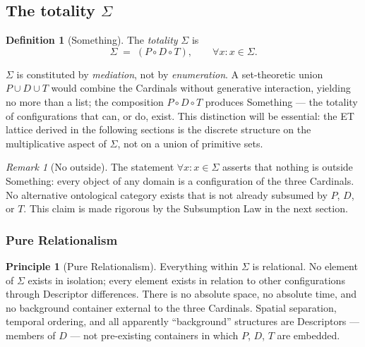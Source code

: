 \documentclass[11pt,a4paper]{article}
\theoremstyle{definition}
\newtheorem{definition}[theorem]{Definition}
\newtheorem{principle}[theorem]{Principle}
\theoremstyle{remark}
\newtheorem{remark}[theorem]{Remark}
\begin{document}
\subsection{The totality $\Sigma$}\label{subsec:Sigma}

\begin{definition}[Something]\label{def:Sigma}
The \emph{totality} $\Sigma$ is
\[
\Sigma \;=\; (P \circ D \circ T), \qquad \forall x: x \in \Sigma.
\]
\end{definition}

$\Sigma$ is constituted by \emph{mediation}, not by \emph{enumeration}. A set-theoretic union $P \cup D \cup T$ would combine the Cardinals without generative interaction, yielding no more than a list; the composition $P \circ D \circ T$ produces Something --- the totality of configurations that can, or do, exist. This distinction will be essential: the ET lattice derived in the following sections is the discrete structure on the multiplicative aspect of $\Sigma$, not on a union of primitive sets.

\begin{remark}[No outside]
The statement $\forall x : x \in \Sigma$ asserts that nothing is outside Something: every object of any domain is a configuration of the three Cardinals. No alternative ontological category exists that is not already subsumed by $P$, $D$, or $T$. This claim is made rigorous by the Subsumption Law in the next section.
\end{remark}

\subsubsection{Pure Relationalism}\label{subsubsec:relationalism}

\begin{principle}[Pure Relationalism]\label{princ:relationalism}
Everything within $\Sigma$ is relational. No element of $\Sigma$ exists in isolation; every element exists in relation to other configurations through Descriptor differences. There is no absolute space, no absolute time, and no background container external to the three Cardinals. Spatial separation, temporal ordering, and all apparently ``background'' structures are Descriptors --- members of $D$ --- not pre-existing containers in which $P$, $D$, $T$ are embedded.
\end{principle}
\end{document}
